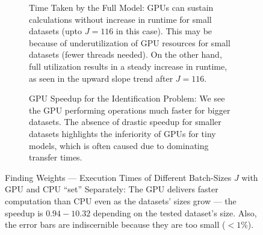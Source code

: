 \begin{figure}[!htbp]
\begin{subfigure}{\textwidth}
        \caption{Time Taken by the Full Model: GPUs can sustain calculations without increase in runtime for small datasets (upto $J=116$ in this case). This may be because of underutilization of GPU resources for small datasets (fewer threads needed). On the other hand, full utilization results in a steady increase in runtime, as seen in the upward slope trend after $J=116$.}
    \end{subfigure}\vspace*{1em}
    \begin{subfigure}{\textwidth}
        \centering
        \caption{GPU Speedup for the Identification Problem: We see the GPU performing operations much faster for bigger datasets. The absence of drastic speedup for smaller datasets highlights the inferiority of GPUs for tiny models, which is often caused due to dominating transfer times.}
    \end{subfigure}
    \caption[Finding Weights --- Execution Times of Different Batch-Sizes $J$ with GPU and CPU ``set'' Separately]{Finding Weights --- Execution Times of Different Batch-Sizes $J$ with GPU and CPU ``set'' Separately: The GPU delivers faster computation than CPU even as the datasets' sizes grow --- the speedup is $0.94-10.32$ depending on the tested dataset's size. Also, the error bars are indiscernible because they are too small ($< 1\%$).}
    \label{fig:Execution Times of Different Batch-Sizes with GPU and CPU ``set'' Separately}
\end{figure}

